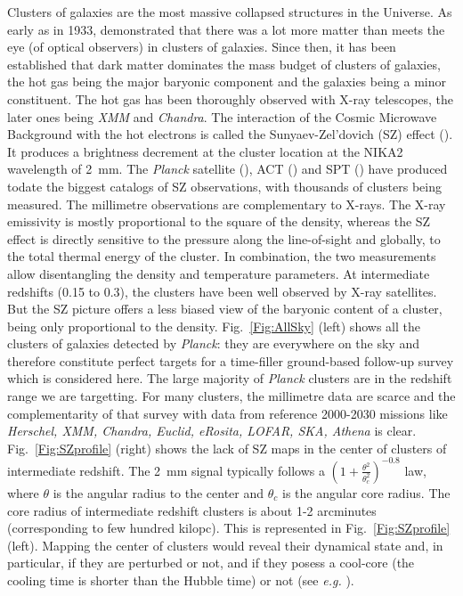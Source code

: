 \documentclass[10pt,a4paper,twoside,graphicx,color]{article}
\begin{document}
\vspace{-0.1cm}  Clusters
of galaxies are the most massive collapsed structures in the
Universe. As early as in 1933, \cite{Zwicky1933} demonstrated that
there was a lot more matter than meets the eye (of optical observers)
in clusters of galaxies. Since then, it has been established that dark
matter dominates the mass budget of clusters of galaxies, the hot gas
being the major baryonic component and the galaxies being a minor
constituent. The hot gas has been thoroughly observed with X-ray
telescopes, the later ones being {\sl XMM} and {\sl Chandra}. The
interaction of the Cosmic Microwave Background with the hot electrons
is called the Sunyaev-Zel'dovich (SZ) effect (\cite{SZ1972}). It
produces a brightness decrement at the cluster location at the NIKA2
wavelength of 2~mm.  The {\sl Planck} satellite (\cite{PSZ2}), ACT
(\cite{Hilton2021}) and SPT (\cite{Bleem2015}) have produced todate
the biggest catalogs of SZ observations, with thousands of clusters
being measured. The millimetre observations are complementary to
X-rays. The X-ray emissivity is mostly proportional to the square of
the density, whereas the SZ effect is directly sensitive to the
pressure along the line-of-sight and globally, to the total thermal
energy of the cluster. In combination, the two measurements allow
disentangling the density and temperature parameters. At intermediate
redshifts (0.15 to 0.3), the clusters have been well observed by X-ray
satellites. But the SZ picture offers a less biased view of the
baryonic content of a cluster, being only proportional to the density.
Fig.~\ref{Fig:AllSky} (left) shows all the clusters of galaxies
detected by {\sl Planck}: they are everywhere on the sky and therefore
constitute perfect targets for a time-filler ground-based follow-up
survey which is considered here. The large majority of {\sl Planck}
clusters are in the redshift range we are targetting. For many
clusters, the millimetre data are scarce and the complementarity of
that survey with data from reference 2000-2030 missions like {\sl
  Herschel, XMM, Chandra, Euclid, eRosita, LOFAR, SKA, Athena} is
clear. Fig.~\ref{Fig:SZprofile} (right) shows the lack of SZ maps in
the center of clusters of intermediate redshift. The 2~mm signal
typically follows a $(1+\frac{\theta^2}{\theta_c^2 })^{-0.8}$ law,
where $\theta$ is the angular radius to the center and $\theta_c$ is
the angular core radius. The core radius of intermediate redshift
clusters is about 1-2 arcminutes (corresponding to few hundred
kilopc). This is represented in Fig.~\ref{Fig:SZprofile}
(left). Mapping the center of clusters would reveal their dynamical
state and, in particular, if they are perturbed or not, and if they
posess a cool-core (the cooling time is shorter than the Hubble time)
or not (see {\sl e.g.} \cite{Hudson2010}). \\
\end{document}
